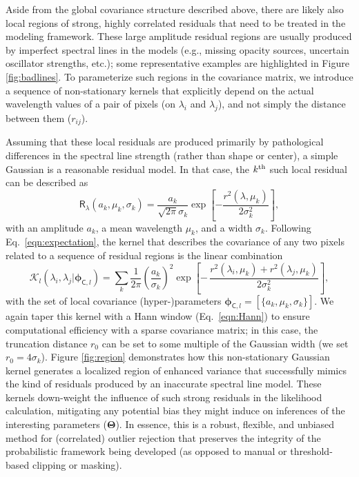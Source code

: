 \documentclass[iop,floatfix]{emulateapj}
\newcommand{\vR}{\mathsf{R}}
\newcommand{\vT}{ {\bm \Theta}}
\newcommand{\vp}{ {\bm \phi}}
\newcommand{\KK}{\mathcal{K}}
\newcommand{\Klocal}{\KK_l}
\begin{document}
Aside from the global covariance structure described above, there are likely also local regions of 
strong, highly correlated residuals that need to be treated in the modeling framework.  These large 
amplitude residual regions are usually produced by imperfect spectral lines in the models (e.g., 
missing opacity sources, uncertain oscillator strengths, etc.); some representative examples are 
highlighted in Figure \ref{fig:badlines}.  To parameterize such regions in the covariance matrix, 
we introduce a sequence of non-stationary kernels that explicitly depend on the actual wavelength 
values of a pair of pixels (on $\lambda_i$ and $\lambda_j$), and not simply the distance between 
them ($r_{ij}$).  

Assuming that these local residuals are produced primarily by pathological differences in the 
spectral line strength (rather than shape or center), a simple Gaussian is a reasonable residual 
model.  In that case, the $k^{\rm th}$ such local residual can be described as
\begin{equation}
\vR_{\lambda}(a_k, \mu_k, \sigma_k) = \frac{a_k}{\sqrt{2\pi}{\sigma_k}} \exp \left[ - \frac{r^2(\lambda,\mu_k)}{2\sigma_k^2} \right],
\end{equation}
with an amplitude $a_k$, a mean wavelength $\mu_k$, and a width $\sigma_k$.  Following 
Eq.~\ref{eqn:expectation}, the kernel that describes the covariance of any two pixels related to a 
sequence of residual regions is the linear combination
\begin{equation}
  \Klocal(\lambda_i, \lambda_j | \vp_{{\mathsf C}, l}) = \sum_k
  \frac{1}{2\pi} \left(\frac{a_k}{\sigma_k}\right)^2 \exp \left [ - \, \frac{r^2(\lambda_i, \mu_k) + r^2(\lambda_j, \mu_k)}{2 \sigma_k^2}\right ],
\label{eqn:klocal}
\end{equation}
with the set of local covariance (hyper-)parameters $\vp_{{\mathsf C},l} = [\{a_k, \mu_k, 
\sigma_k\}]$.
We again taper this kernel with a Hann window (Eq.~\ref{eqn:Hann}) to ensure computational 
efficiency with a sparse covariance matrix; in this case, the truncation distance $r_0$ can be set 
to some multiple of the Gaussian width (we set $r_0 = 4\sigma_k$).  Figure \ref{fig:region} 
demonstrates how this non-stationary Gaussian kernel generates a localized region of enhanced 
variance that successfully mimics the kind of residuals produced by an inaccurate spectral line 
model.  These kernels down-weight the influence of such strong residuals in the likelihood 
calculation, mitigating any potential bias they might induce on inferences of the interesting 
parameters ($\vT$).  In essence, this is a robust, flexible, and unbiased method for (correlated) 
outlier rejection that preserves the integrity of the probabilistic framework being developed (as 
opposed to manual or threshold-based clipping or masking).  
\end{document}
